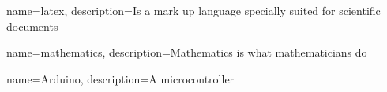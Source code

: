 {
    name=latex,
    description={Is a mark up language specially suited for scientific documents}
}

{
    name=mathematics,
    description={Mathematics is what mathematicians do}
}

{
    name=Arduino,
    description={A microcontroller}
}

